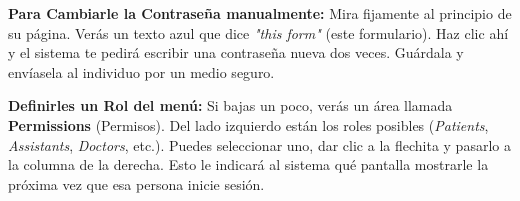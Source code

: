 \textbf{Para Cambiarle la Contraseña manualmente:}
Mira fijamente al principio de su página. Verás un texto azul que dice \textit{"this form"} (este formulario). Haz clic ahí y el sistema te pedirá escribir una contraseña nueva dos veces. Guárdala y envíasela al individuo por un medio seguro.

\textbf{Definirles un Rol del menú:}
Si bajas un poco, verás un área llamada \textbf{Permissions} (Permisos). Del lado izquierdo están los roles posibles (\textit{Patients}, \textit{Assistants}, \textit{Doctors}, etc.). Puedes seleccionar uno, dar clic a la flechita y pasarlo a la columna de la derecha. Esto le indicará al sistema qué pantalla mostrarle la próxima vez que esa persona inicie sesión.
